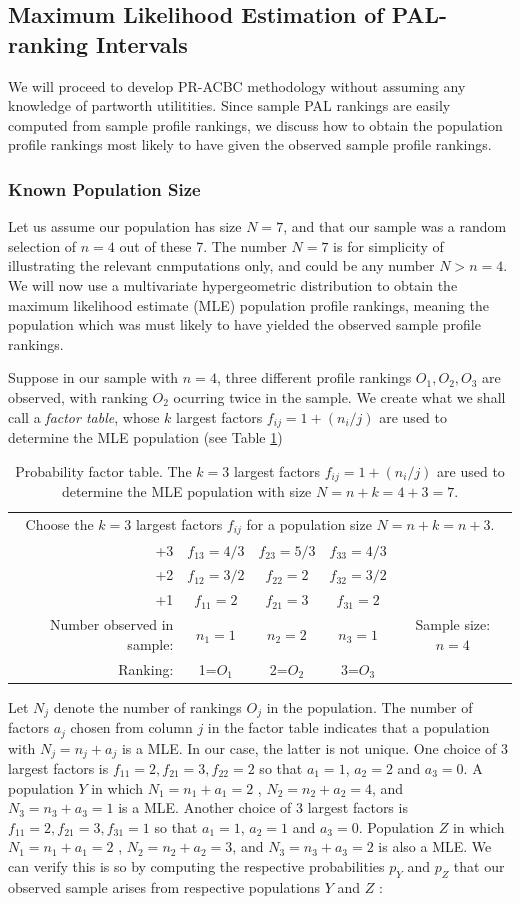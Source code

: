 \documentclass[a4paper, 12pt]{article}
\begin{document}
\subsection{Maximum Likelihood Estimation of PAL-ranking Intervals}
We will proceed to develop PR-ACBC methodology without assuming any knowledge of partworth utilitities.  Since sample PAL rankings are easily computed from sample profile rankings, we discuss how to obtain the population profile rankings most likely to have given the observed sample profile rankings.
\subsubsection{Known Population Size}
Let us assume our population has size $N=7$, and that our sample was a random selection of $n=4$ out of these 7. The number $N=7$ is for simplicity of illustrating the relevant cnmputations only, and could be any number $N>n=4$.  We will now use a multivariate hypergeometric distribution to obtain the maximum likelihood estimate (MLE) population profile rankings, meaning the population which was must likely to have yielded the observed sample profile rankings.  

Suppose in our sample with $n=4$,  three different profile rankings $O_1,O_2,O_3$ are observed, with ranking $O_2$ ocurring twice in the sample. We create what we shall call a \emph{factor table}, whose $k$ largest factors $f_{ij}=1+(n_i/j)$ are used to determine the MLE population (see Table \ref{FT}) 
\begin{table}[!htpb]
	\scriptsize
	\centering
	\begin{tabular}{r|ccc|c}\hline
		\multicolumn{5}{c}{Choose the $k=3$ largest factors $f_{ij}$ for a population size $N=n+k=n+3$.}\\ 
		+3& $f_{13}=4/3$ & $f_{23}=5/3$&$f_{33}=4/3$&\\
		+2& $f_{12}=3/2$ & $f_{22}=2$ &$f_{32}=3/2 $&\\
		+1& $f_{11}=2$  &$f_{21}=3$&$f_{31}=2 $ &\\\hline
		Number observed in sample:&$n_1=1$& $n_2=2$ & $n_3=1$ & Sample size: $n=4$\\\hline
		Ranking:&1=$O_1$&2=$O_2$&3=$O_3$
	\end{tabular}
	\caption{Probability factor table. The $k=3$ largest factors $f_{ij}=1+(n_i/j)$ are used to determine the MLE population with size $N=n+k=4+3=7$. }
	\label{FT}
\end{table}
{\flushleft  Let} $N_j$ denote the number of rankings $O_j$ in the population.  The number of factors $a_j$ chosen from column $j$ in the factor table indicates that a  population with $N_j= n_j+a_j$ is a MLE.    In our case, the latter is not unique.  One choice of 3 largest factors is $f_{11}=2, f_{21}=3,f_{22}=2$ so that $a_1=1$, $a_2=2$ and $a_3=0$. A population $Y$ in which $N_1=n_1+a_1=2$ , $N_2=n_2+a_2=4$, and $N_3=n_3+a_3=1$ is a MLE. Another choice of 3 largest factors  is $f_{11}=2, f_{21}=3,f_{31}=1$ so that $a_1=1$, $a_2=1$ and $a_3=0$. Population $Z$ in which $N_1=n_1+a_1=2$ , $N_2=n_2+a_2=3$, and $N_3=n_3+a_3=2$ is also a MLE. We can verify this is so by computing the respective probabilities $p_Y$ and $p_Z$ that our observed sample arises from respective populations $Y$ and $Z$ :
\end{document}

